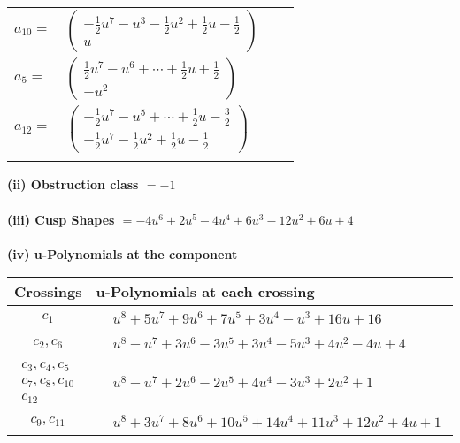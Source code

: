 \documentclass[1p]{elsarticle_modified}
\theoremstyle{definition}
\begin{document}
\begin{tabular}{m{7pt} m{180pt} m{7pt} m{180pt} }
\flushright $a_{10}=$&$\begin{pmatrix}-\frac{1}{2} u^7- u^3-\frac{1}{2} u^2+\frac{1}{2} u-\frac{1}{2}\\u\end{pmatrix}$ \\
\flushright $a_{5}=$&$\begin{pmatrix}\frac{1}{2} u^7- u^6+\cdots+\frac{1}{2} u+\frac{1}{2}\\- u^2\end{pmatrix}$ \\
\flushright $a_{12}=$&$\begin{pmatrix}-\frac{1}{2} u^7- u^5+\cdots+\frac{1}{2} u-\frac{3}{2}\\-\frac{1}{2} u^7-\frac{1}{2} u^2+\frac{1}{2} u-\frac{1}{2}\end{pmatrix}$\\&\end{tabular}
\flushleft \textbf{(ii) Obstruction class $= -1$}\\~\\
\flushleft \textbf{(iii) Cusp Shapes $= -4 u^6+2 u^5-4 u^4+6 u^3-12 u^2+6 u+4$}\\~\\
\newpage\renewcommand{\arraystretch}{1}
\flushleft \textbf{(iv) u-Polynomials at the component}\newline \\
\begin{tabular}{m{50pt}|m{274pt}}
Crossings & \hspace{64pt}u-Polynomials at each crossing \\
\hline $$\begin{aligned}c_{1}\end{aligned}$$&$\begin{aligned}
&u^8+5 u^7+9 u^6+7 u^5+3 u^4- u^3+16 u+16
\end{aligned}$\\
\hline $$\begin{aligned}c_{2},c_{6}\end{aligned}$$&$\begin{aligned}
&u^8- u^7+3 u^6-3 u^5+3 u^4-5 u^3+4 u^2-4 u+4
\end{aligned}$\\
\hline $$\begin{aligned}c_{3},c_{4},c_{5}\\c_{7},c_{8},c_{10}\\c_{12}\end{aligned}$$&$\begin{aligned}
&u^8- u^7+2 u^6-2 u^5+4 u^4-3 u^3+2 u^2+1
\end{aligned}$\\
\hline $$\begin{aligned}c_{9},c_{11}\end{aligned}$$&$\begin{aligned}
&u^8+3 u^7+8 u^6+10 u^5+14 u^4+11 u^3+12 u^2+4 u+1
\end{aligned}$\\
\hline
\end{tabular}\\~\\
\end{document}
